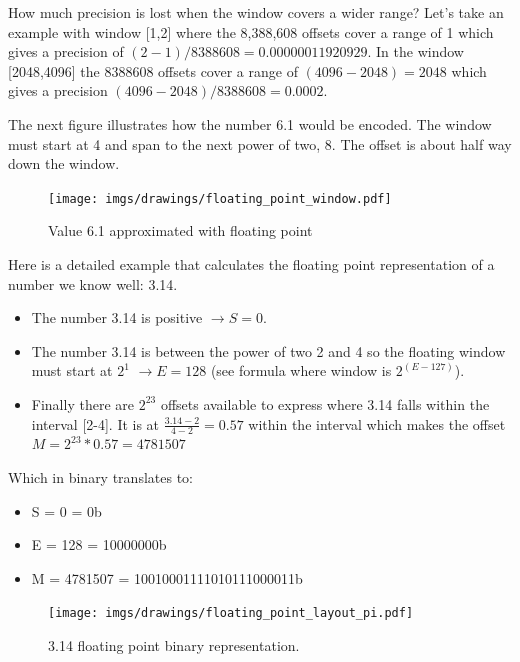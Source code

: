 \documentclass[book.tex]{subfiles}
\begin{document}
\par {} How much precision is lost when the window covers a wider range? Let's take an example with window [1,2] where the 8,388,608 offsets cover a range of 1 which gives a precision of $(2-1)/8388608=0.00000011920929$. In the window [2048,4096] the 8388608 offsets cover a range of $(4096-2048) = 2048$ which gives a precision $ (4096-2048)/8388608=0.0002$.\\
\par

The next figure illustrates how the number 6.1 would be encoded. The window must start at 4 and span to the next power of two, 8. The offset is about half way down the window.

\begin{figure}[H]
\centering
\texttt{[image: imgs/drawings/floating\_point\_window.pdf]}

\caption{Value 6.1 approximated with floating point}
\label{fig:fp_internals_window6_1}
\end{figure}
  \bigskip
  
Here is a detailed example that calculates the floating point representation of a number we know well: 3.14.
\begin{itemize}
 \item The number 3.14 is positive  $\rightarrow S=0$.
 \item The number 3.14 is between the power of two 2 and 4 so the floating window must start at $2^1$  $\rightarrow E=128$ (see formula where window is $2^{(E-127)}$).
 \item Finally there are $2^{23}$ offsets available to express where 3.14 falls within the interval [2-4]. It is at $\frac{3.14 -2 }{4 - 2} = 0.57$ within the interval which makes the offset $ M = 2^{23}*0.57 = 4781507$
\end{itemize}

Which in binary translates to:

\begin{itemize}
\item S = 0 = 0b
\item E = 128 = 10000000b
\item M = 4781507 = 10010001111010111000011b
\end{itemize}

\begin{figure}[H]
\centering
\texttt{[image: imgs/drawings/floating\_point\_layout\_pi.pdf]}
\caption{3.14 floating point binary representation.}
\label{fig:fp_internals}
\end{figure}
  \bigskip
\end{document}
